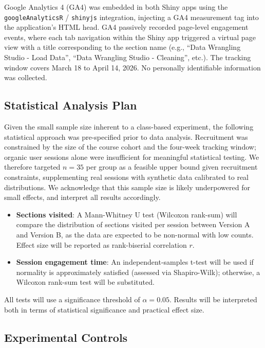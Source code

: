 \documentclass{article}
\begin{document}
            Google Analytics 4 (GA4) was embedded in both Shiny apps using the \texttt{googleAnalyticsR} / \texttt{shinyjs} integration, injecting a GA4 measurement tag into the application's HTML head. GA4 passively recorded page-level engagement events, where each tab navigation within the Shiny app triggered a virtual page view with a title corresponding to the section name (e.g., ``Data Wrangling Studio - Load Data'', ``Data Wrangling Studio - Cleaning'', etc.). The tracking window covers March 18 to April 14, 2026. No personally identifiable information was collected.

            \subsection{Statistical Analysis Plan}

            Given the small sample size inherent to a class-based experiment, the following statistical approach was pre-specified prior to data analysis. Recruitment was constrained by the size of the course cohort and the four-week tracking window; organic user sessions alone were insufficient for meaningful statistical testing. We therefore targeted $n = 35$ per group as a feasible upper bound given recruitment constraints, supplementing real sessions with synthetic data calibrated to real distributions. We acknowledge that this sample size is likely underpowered for small effects, and interpret all results accordingly.

            \begin{itemize}
                \item \textbf{Sections visited}: A Mann-Whitney U test (Wilcoxon rank-sum) will compare the distribution of sections visited per session between Version A and Version B, as the data are expected to be non-normal with low counts. Effect size will be reported as rank-biserial correlation $r$.
                    \item \textbf{Session engagement time}: An independent-samples t-test will be used if normality is approximately satisfied (assessed via Shapiro-Wilk); otherwise, a Wilcoxon rank-sum test will be substituted.
                        \end{itemize}

                        All tests will use a significance threshold of $\alpha = 0.05$. Results will be interpreted both in terms of statistical significance and practical effect size.

                        \subsection{Experimental Controls}
\end{document}

